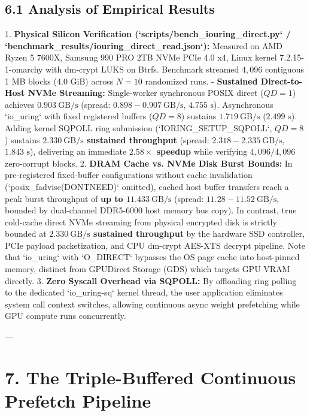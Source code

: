 \documentclass[11pt,twoside,openright]{amsbook}
\begin{document}
{{{{{{\subsection{6.1 Analysis of Empirical Results}

1. \textbf{Physical Silicon Verification (`scripts/bench_iouring_direct.py` / `benchmark_results/iouring_direct_read.json`):}  
   Measured on AMD Ryzen 5 7600X, Samsung 990 PRO 2TB NVMe PCIe 4.0 x4, Linux kernel 7.2.15-1-omarchy with dm-crypt LUKS on Btrfs. Benchmark streamed $4,096$ contiguous 1 MB blocks ($4.0\text{ GiB}$) across $N = 10$ randomized runs.
   - \textbf{Sustained Direct-to-Host NVMe Streaming:} Single-worker synchronous POSIX direct ($QD=1$) achieves $0.903\ \text{GB/s}$ (spread: $0.898 - 0.907\ \text{GB/s}$, $4.755\text{ s}$). Asynchronous `io_uring` with fixed registered buffers ($QD=8$) sustains $1.719\ \text{GB/s}$ ($2.499\text{ s}$). Adding kernel SQPOLL ring submission (`IORING_SETUP_SQPOLL`, $QD=8$) sustains \textbf{$2.330\ \text{GB/s}$ sustained throughput} (spread: $2.318 - 2.335\ \text{GB/s}$, $1.843\text{ s}$), delivering an immediate \textbf{$2.58\times$ speedup} while verifying $4,096/4,096$ zero-corrupt blocks.
2. \textbf{DRAM Cache vs. NVMe Disk Burst Bounds:}  
   In pre-registered fixed-buffer configurations without cache invalidation (`posix_fadvise(DONTNEED)` omitted), cached host buffer transfers reach a peak burst throughput of \textbf{up to $11.433\ \text{GB/s}$} (spread: $11.28 - 11.52\ \text{GB/s}$, bounded by dual-channel DDR5-6000 host memory bus copy). In contrast, true cold-cache direct NVMe streaming from physical encrypted disk is strictly bounded at \textbf{$2.330\ \text{GB/s}$ sustained throughput} by the hardware SSD controller, PCIe payload packetization, and CPU dm-crypt AES-XTS decrypt pipeline. Note that `io_uring` with `O_DIRECT` bypasses the OS page cache into host-pinned memory, distinct from GPUDirect Storage (GDS) which targets GPU VRAM directly.
3. \textbf{Zero Syscall Overhead via SQPOLL:}  
   By offloading ring polling to the dedicated `io_uring-sq` kernel thread, the user application eliminates system call context switches, allowing continuous async weight prefetching while GPU compute runs concurrently.

---

\section{7. The Triple-Buffered Continuous Prefetch Pipeline}

}}}}}}
\end{document}
